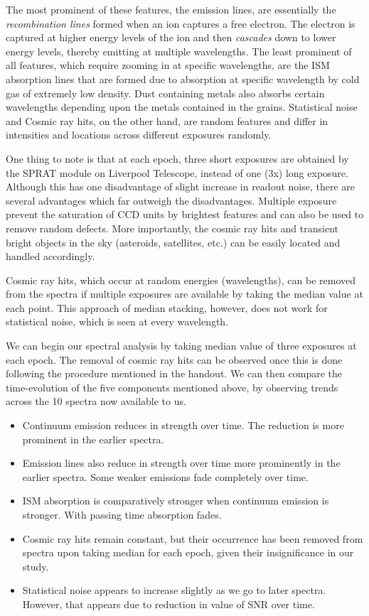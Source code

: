 \documentclass{tda}
\begin{document}
	The most prominent of these features, the emission lines, are essentially the \emph{recombination lines} formed when an ion captures a free electron. The electron is captured at higher energy levels of the ion and then \emph{cascades} down to lower energy levels, thereby emitting at multiple wavelengths. The least prominent of all features, which require zooming in at specific wavelengths, are the ISM absorption lines that are formed due to absorption at specific wavelength by cold gas of extremely low density. Dust containing metals also absorbs certain wavelengths depending upon the metals contained in the grains. Statistical noise and Cosmic ray hits, on the other hand, are random features and differ in intensities and locations across different exposures randomly. 

	One thing to note is that at each epoch, three short exposures are obtained by the SPRAT module on Liverpool Telescope, instead of one (3x) long exposure. Although this has one disadvantage of slight increase in readout noise, there are several advantages which far outweigh the disadvantages. Multiple exposure prevent the saturation of CCD units by brightest features and can also be used to remove random defects. More importantly, the cosmic ray hits and transient bright objects in the sky (asteroids, satellites, etc.) can be easily located and handled accordingly. 

	Cosmic ray hits, which occur at random energies (wavelengths), can be removed from the spectra if multiple exposures are available by taking the median value at each point. This approach of median stacking, however, does not work for statistical noise, which is seen at every wavelength.

	We can begin our spectral analysis by taking median value of three exposures at each epoch. The removal of cosmic ray hits can be observed once this is done following the procedure mentioned in the handout. We can then compare the time-evolution of the five components mentioned above, by observing trends across the 10 spectra now available to us. 

	\begin{itemize}
		\item Continuum emission reduces in strength over time. The reduction is more prominent in the earlier spectra.
		\item Emission lines also reduce in strength over time more prominently in the earlier spectra. Some weaker emissions fade completely over time.
		\item ISM absorption is comparatively stronger when continuum emission is stronger. With passing time absorption fades.
		\item Cosmic ray hits remain constant, but their occurrence has been removed from spectra upon taking median for each epoch, given their insignificance in our study.
		\item Statistical noise appears to increase slightly as we go to later spectra. However, that appears due to reduction in value of SNR over time.
	\end{itemize}
\end{document}
